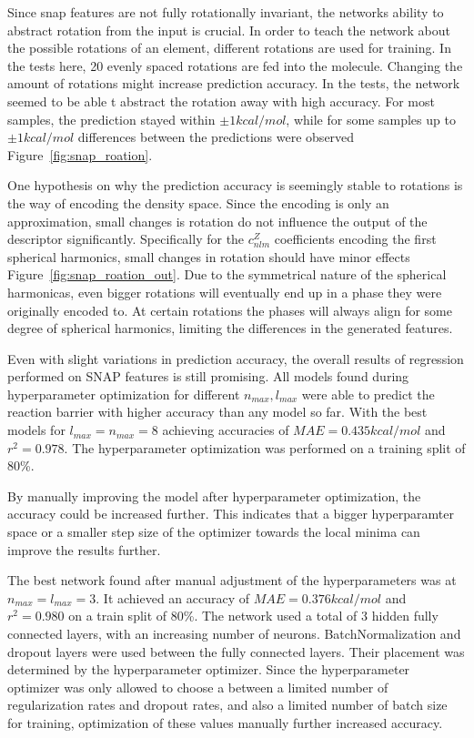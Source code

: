 Since snap features are not fully rotationally invariant, the networks ability to abstract rotation from the input is crucial.
In order to teach the network about the possible rotations of an element, different rotations are used for training.
In the tests here, 20 evenly spaced rotations are fed into the molecule.
Changing the amount of rotations might increase prediction accuracy. 
In the tests, the network seemed to be able t abstract the rotation away with high accuracy.
For most samples, the prediction stayed within $\pm 1 kcal/mol$, while for some samples up to $\pm 1 kcal/mol$ 
differences between the predictions were observed Figure~\ref{fig:snap_roation}.

One hypothesis on why the prediction accuracy is seemingly stable to rotations is the way of encoding the density space.
Since the encoding is only an approximation, small changes is rotation do not influence the output of the descriptor significantly.
Specifically for the $c_{nlm}^Z$ coefficients encoding the first spherical harmonics, small changes in rotation
should have minor effects Figure~\ref{fig:snap_roation_out}.
Due to the symmetrical nature of the spherical harmonicas, even bigger rotations will eventually end up in a phase 
they were originally encoded to.
At certain rotations the phases will always align for some degree of spherical harmonics, limiting the differences in the
generated features.


Even with slight variations in prediction accuracy, the overall results of regression performed on SNAP features is still promising.
All models found during hyperparameter optimization for different $n_{max}, l_{max}$ were able to predict the reaction barrier with higher accuracy than any model so far.
With the best models for $l_{max}=n_{max}=8$ achieving accuracies of $MAE=0.435 kcal/mol$ and $r^2=0.978$.
The hyperparameter optimization was performed on a training split of 80\%.

By manually improving the model after hyperparameter optimization, the accuracy could be increased further.
This indicates that a bigger hyperparamter space or a smaller step size of the optimizer towards the local minima can 
improve the results further.

The best network found after manual adjustment of the hyperparameters was at $n_{max}=l_{max}=3$.
It achieved an accuracy of $MAE=0.376 kcal/mol$ and $r^2=0.980$ on a train split of 80\%.
The network used a total of 3 hidden fully connected layers, with an increasing number of neurons.
BatchNormalization and dropout layers were used between the fully connected layers.
Their placement was determined by the hyperparameter optimizer.
Since the hyperparameter optimizer was only allowed to choose a between a limited number 
of regularization rates and dropout rates, and also a limited number of batch size for training,
optimization of these values manually further increased accuracy.


